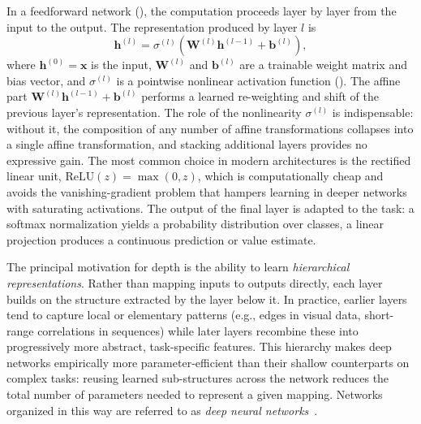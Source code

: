 In a feedforward network (), 
 the computation proceeds layer by layer from the input to the output.
%
The representation produced by layer $l$ is
%
\begin{equation}
    \mathbf{h}^{(l)}
    =
    \sigma^{(l)}
    \left(
        \mathbf{W}^{(l)}
        \mathbf{h}^{(l-1)}
        +
        \mathbf{b}^{(l)}
    \right),
    \label{eq:neural-network-layer}
\end{equation}
%
where $\mathbf{h}^{(0)} = \mathbf{x}$ is the input,
$\mathbf{W}^{(l)}$ and $\mathbf{b}^{(l)}$ are a trainable weight matrix and bias vector, and
$\sigma^{(l)}$ is a pointwise nonlinear activation function ().
%
The affine part $\mathbf{W}^{(l)} \mathbf{h}^{(l-1)} + \mathbf{b}^{(l)}$
 performs a learned re-weighting and shift of the previous layer's representation.
%
The role of the nonlinearity $\sigma^{(l)}$ is indispensable:
 without it, the composition of any number of affine transformations collapses
 into a single affine transformation, and stacking additional layers provides no expressive gain.
%
The most common choice in modern architectures is the rectified linear unit,
 $\mathrm{ReLU}(z) = \max(0, z)$,
 which is computationally cheap and avoids the vanishing-gradient problem
 that hampers learning in deeper networks with saturating activations.
%
The output of the final layer is adapted to the task: 
 a softmax normalization yields a probability distribution over classes,
 a linear projection produces a continuous prediction or value estimate.

The principal motivation for depth is the ability to learn \emph{hierarchical representations}.
%
Rather than mapping inputs to outputs directly, each layer builds on the structure extracted by the layer below it.
%
In practice, earlier layers tend to capture local or elementary patterns
 (e.g., edges in visual data, short-range correlations in sequences)
 while later layers recombine these into progressively more abstract, task-specific features.
%
This hierarchy makes deep networks empirically more parameter-efficient than their
 shallow counterparts on complex tasks:
 reusing learned sub-structures across the network reduces the total number of parameters
 needed to represent a given mapping.
%
Networks organized in this way are referred to as \emph{deep neural networks}~\cite{DBLP:books/daglib/0040158}.

